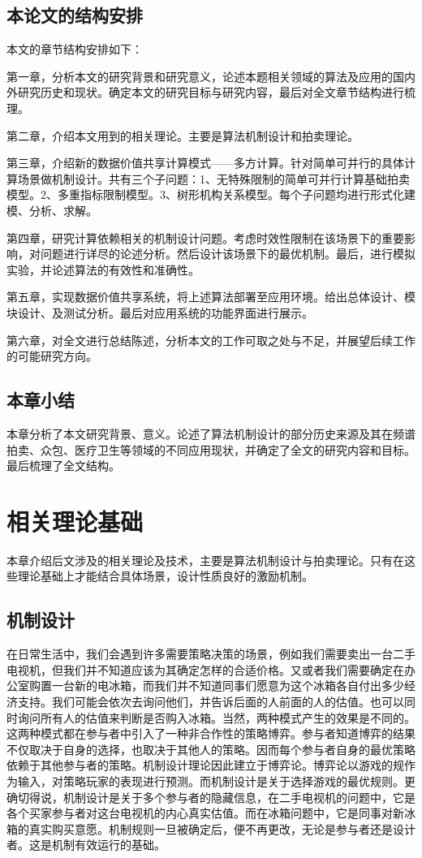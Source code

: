 \documentclass[promaster]{thesis-uestc}
\begin{document}
\section{本论文的结构安排}
本文的章节结构安排如下：

第一章，分析本文的研究背景和研究意义，论述本题相关领域的算法及应用的国内外研究历史和现状。确定本文的研究目标与研究内容，最后对全文章节结构进行梳理。

第二章，介绍本文用到的相关理论。主要是算法机制设计和拍卖理论。

第三章，介绍新的数据价值共享计算模式——多方计算。针对简单可并行的具体计算场景做机制设计。共有三个子问题：1、无特殊限制的简单可并行计算基础拍卖模型。2、多重指标限制模型。3、树形机构关系模型。每个子问题均进行形式化建模、分析、求解。

第四章，研究计算依赖相关的机制设计问题。考虑时效性限制在该场景下的重要影响，对问题进行详尽的论述分析。然后设计该场景下的最优机制。最后，进行模拟实验，并论述算法的有效性和准确性。

第五章，实现数据价值共享系统，将上述算法部署至应用环境。给出总体设计、模块设计、及测试分析。最后对应用系统的功能界面进行展示。

第六章，对全文进行总结陈述，分析本文的工作可取之处与不足，并展望后续工作的可能研究方向。

\section{本章小结}
本章分析了本文研究背景、意义。论述了算法机制设计的部分历史来源及其在频谱拍卖、众包、医疗卫生等领域的不同应用现状，并确定了全文的研究内容和目标。最后梳理了全文结构。


\chapter{相关理论基础}
本章介绍后文涉及的相关理论及技术，主要是算法机制设计与拍卖理论。只有在这些理论基础上才能结合具体场景，设计性质良好的激励机制。

\section{机制设计}
在日常生活中，我们会遇到许多需要策略决策的场景，例如我们需要卖出一台二手电视机，但我们并不知道应该为其确定怎样的合适价格。又或者我们需要确定在办公室购置一台新的电冰箱，而我们并不知道同事们愿意为这个冰箱各自付出多少经济支持。我们可能会依次去询问他们，并告诉后面的人前面的人的估值。也可以同时询问所有人的估值来判断是否购入冰箱。当然，两种模式产生的效果是不同的。这两种模式都在参与者中引入了一种非合作性的策略博弈。参与者知道博弈的结果不仅取决于自身的选择，也取决于其他人的策略。因而每个参与者自身的最优策略依赖于其他参与者的策略。机制设计理论因此建立于博弈论。博弈论以游戏的规作为输入，对策略玩家的表现进行预测。而机制设计是关于选择游戏的最优规则。更确切得说，机制设计是关于多个参与者的隐藏信息，在二手电视机的问题中，它是各个买家参与者对这台电视机的内心真实估值。而在冰箱问题中，它是同事对新冰箱的真实购买意愿。机制规则一旦被确定后，便不再更改，无论是参与者还是设计者。这是机制有效运行的基础。
\end{document}
